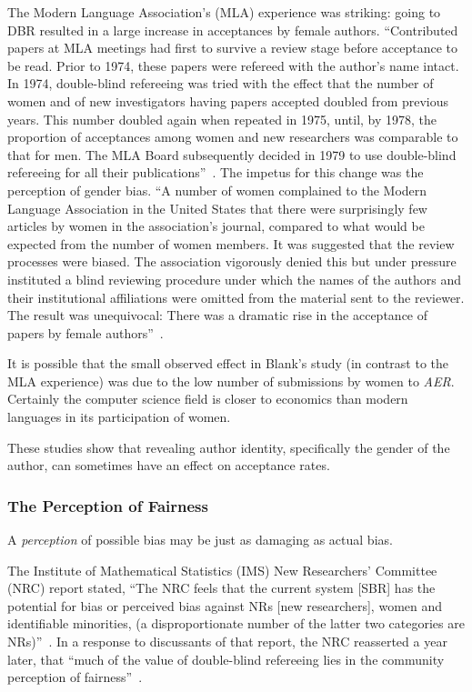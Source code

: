 \documentclass[acmtods,acmnow]{acmtrans2m}
\begin{document}
The Modern Language Association's (MLA) experience was striking:
going to DBR resulted in a large increase in acceptances by female authors.
``Contributed papers at MLA meetings had first to survive a
review stage before acceptance to be read. Prior to 1974, these papers were
refereed with the author's name intact. In 1974, double-blind refereeing was
tried with the effect that the number of women and of new investigators
having papers accepted doubled from previous years. This number doubled
again when repeated in 1975, until, by 1978, the proportion of acceptances
among women and new researchers was comparable to that for men. The MLA Board
subsequently decided in 1979 to use double-blind refereeing for all their
publications''~\cite[page~321]{billard93}. The impetus for this change was
the perception of gender bias. ``A number of women complained to the Modern
Language Association in the United States that there were surprisingly few
articles by women in the association's journal, compared to what would be
expected from the number of women members. It was suggested that the review
processes were biased. The association vigorously denied this but under
pressure instituted a blind reviewing procedure under which the names of the
authors and their institutional affiliations were omitted from the material
sent to the reviewer. The result was unequivocal: There was a dramatic rise
in the acceptance of papers by female authors''~\cite[page 217]{horrobin82}.

It is possible that the small observed effect in Blank's study (in contrast
to the MLA experience) was due to the low number of submissions by women to
{\em AER}. Certainly the computer science field is closer to economics than
modern languages in its participation of women.

These studies show that revealing author identity, specifically the gender of
the author, can sometimes have an effect on acceptance rates.

\subsubsection{The Perception of Fairness}

A {\em perception} of possible bias may be just as damaging as actual bias.

The Institute of Mathematical Statistics (IMS) New Researchers' Committee
(NRC) report stated, ``The NRC feels that the current system [SBR] has the
potential for bias or perceived bias against NRs [new researchers], women
and identifiable minorities, (a disproportionate number of the latter two
categories are NRs)''~\cite[page~165]{altman91}.  In a response to
discussants of that report, the NRC reasserted a year later, that ``much of
the value of double-blind refereeing lies in the community perception of
fairness''~\cite[page~266]{altman92}.
\end{document}
